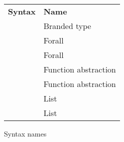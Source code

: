 \begin{figure}[p]

\onehalfspacing
\centering
\begin{tabular}{rl}

\textbf{Syntax} & \textbf{Name} \\

\csbrand{\varbrand}{\varty} & Branded type \\
\tyfor{\tyvar}{\varty} & Forall \\
\csfor{\csvar}{\varcs} & Forall \\
\tyfun{\varty}{\varty} & Function abstraction \\
\csfun{\varcs}{\varcs} & Function abstraction \\
\tylist{\varty} & List \\
\cslist{\varcs} & List \\

\end{tabular}

\caption{Syntax names}
\label{figsyntax2}
\end{figure}
